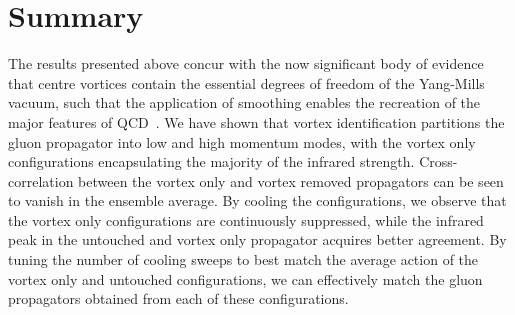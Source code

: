 \section{Summary}
The results presented above concur with the now significant body of evidence that centre vortices contain the essential degrees of freedom of the Yang-Mills vacuum, such that the application of smoothing enables the recreation of the major features of QCD~\cite{Bertle:2001xd,Trewartha:2015ida,Trewartha:2015nna,Trewartha:2017ive,DelDebbio:1998luz}. We have shown that vortex identification partitions the gluon propagator into low and high momentum modes, with the vortex only configurations encapsulating the majority of the infrared strength. Cross-correlation between the vortex only and vortex removed propagators can be seen to vanish in the ensemble average. By cooling the configurations, we observe that the vortex only configurations are continuously suppressed, while the infrared peak in the untouched and vortex only propagator acquires better agreement. By tuning the number of cooling sweeps to best match the average action of the vortex only and untouched configurations, we can effectively match the gluon propagators obtained from each of these configurations.\\

